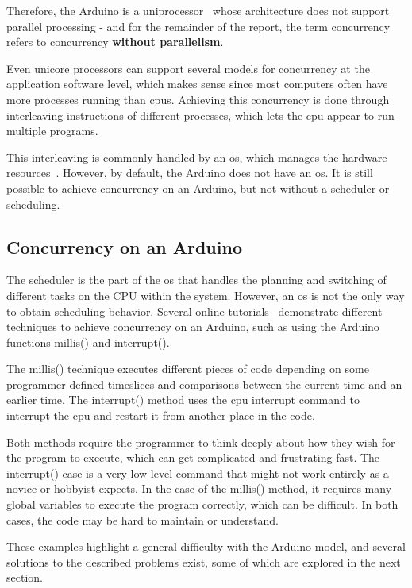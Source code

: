 Therefore, the Arduino is a uniprocessor~\cite{Bryant2016} whose architecture does not support parallel processing - and for the remainder of the report, the term concurrency refers to concurrency \textbf{without parallelism}.

Even unicore processors can support several models for concurrency at the application software level, which makes sense since most computers often have more processes running than \glspl{cpu}. Achieving this concurrency is done through interleaving instructions of different processes, which lets the \gls{cpu} appear to run multiple programs.

This interleaving is commonly handled by an \gls{os}, which manages the hardware resources~\cite{Bryant2016}. However, by default, the Arduino does not have an \gls{os}. It is still possible to achieve concurrency on an Arduino, but not without a scheduler or scheduling.

\subsection{Concurrency on an Arduino}\label{subsec:concurrencyinarduino}
The scheduler is the part of the \gls{os} that handles the planning and switching of different tasks on the CPU within the system. However, an \gls{os} is not the only way to obtain scheduling behavior. Several online tutorials~\cite{BadExample1, BadExample2} demonstrate different techniques to achieve concurrency on an Arduino, such as using the Arduino functions millis() and interrupt().

The millis() technique executes different pieces of code depending on some programmer-defined timeslices and comparisons between the current time and an earlier time. The interrupt() method uses the \gls{cpu} interrupt command to interrupt the \gls{cpu} and restart it from another place in the code.

Both methods require the programmer to think deeply about how they wish for the program to execute, which can get complicated and frustrating fast. The interrupt() case is a very low-level command that might not work entirely as a novice or hobbyist expects. In the case of the millis() method, it requires many global variables to execute the program correctly, which can be difficult. In both cases, the code may be hard to maintain or understand.

These examples highlight a general difficulty with the Arduino model, and several solutions to the described problems exist, some of which are explored in the next section.
